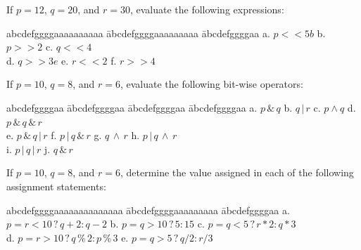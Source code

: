 {\begin{list}{E \thechapter.\theenumi}

\item If $p = 12$, $q = 20$, and $r = 30$, evaluate the following
expressions:


\begin{tabbing}
abcdefggggaaaaaaaaaa \= abcdefggggaaaaaaaaa \= abcdefggggaa
 \kill
  a. $p <\!< 5 b$ \> b. $p >\!> 2$ \> c. $q <\!< 4$ \\
  d. $q >\!> 3 e$ \> e. $r <\!< 2$ \>  f. $r >\!> 4$
\end{tabbing}



\item If $p = 10$, $q = 8$, and $r = 6$, evaluate the following
bit-wise operators:


\begin{tabbing}
abcdefggggaa \= abcdefggggaa \= abcdefggggaa \= abcdefggggaa
 \kill
  a. $p \,\&\, q$ \> b. $q \,\vert\, r$ \> c. $p \wedge q $ \> d. $p \,\&\, q \,\&\, r $ \\
  e. $p \,\&\, q \,\vert\, r$ \> f. $p \,\vert\, q \,\&\, r$ \> g. $q \,\wedge\, r$ \>  h. $p \,\vert\, q \,\wedge\, r$ \\
  i. $p \,\vert\, q \,\vert\, r$ \> j. $q \,\&\, r$ \> \>
\end{tabbing}


\item If $p = 10$, $q = 8$, and $r = 6$, determine the value
assigned in each of the following assignment statements:


\begin{tabbing}
abcdefggggaaaaaaaaaaaaaa \= abcdefggggaaaaaaaaa \= abcdefggggaa
 \kill
  a. $p = r < 10 \,?\, q + 2 : q - 2$ \> b. $p = q > 10 \,?\,  5  :  15$ \> c. $p = q < 5 \,?\, r \ast 2 : q \ast 3$ \\
  d. $p = r > 10 \,?\,  q \,\%\, 2 : p \,\%\, 3$ \> e. $p = q > 5 \,?\, q / 2 :  r / 3$ \>
\end{tabbing}



\end{list}}
